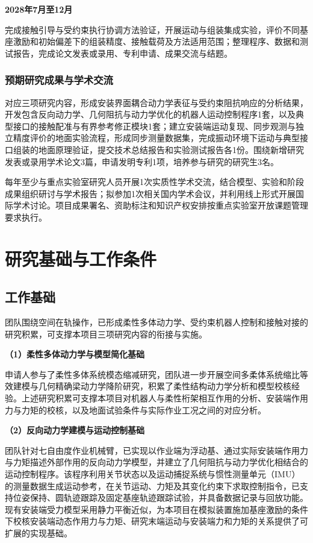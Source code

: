 \documentclass[UTF8,a4paper,zihao=-4,fontset=fandol]{ctexart}
\newcommand{\topic}[1]{\par\Needspace{4\baselineskip}\addvspace{0.5em}\noindent\textbf{#1}\par\nobreak}
\begin{document}
\topic{2028年7月至12月}
完成接触引导与受约束执行协调方法验证，开展运动与组装集成实验，评价不同基座激励和初始偏差下的组装精度、接触载荷及方法适用范围；整理程序、数据和测试报告，完成论文发表或录用、专利申请、成果交流与结题。

\subsubsection{预期研究成果与学术交流}

对应三项研究内容，形成安装界面耦合动力学表征与受约束阻抗响应的分析结果，开发包含反向动力学、几何阻抗与动力学优化的机器人运动控制程序1套，以及典型接口的接触配准与有界参考修正模块1套；建立安装端运动复现、同步观测与独立精度评价的地面实验流程，形成同步测量数据集，完成振动环境下运动与典型接口组装的地面原理验证，提交技术总结报告和实验测试报告各1份。围绕新增研究发表或录用学术论文3篇，申请发明专利1项，培养参与研究的研究生3名。

每年至少与重点实验室研究人员开展1次实质性学术交流，结合模型、实验和阶段成果组织研讨与学术报告；拟参加1次相关国内学术会议，并利用线上形式开展国际学术讨论。项目成果署名、资助标注和知识产权安排按重点实验室开放课题管理要求执行。

\section{研究基础与工作条件}

\subsection{工作基础}

团队围绕空间在轨操作，已形成柔性多体动力学、受约束机器人控制和接触对接的研究积累，可支撑本项目三项研究内容的衔接与实施。

\topic{（1）柔性多体动力学与模型简化基础}

申请人参与了柔性多体系统模态缩减研究\cite{sonneville2021}，团队进一步开展空间多柔体系统缩比等效建模\cite{qi2025}与几何精确梁动力学降阶研究，积累了柔性结构动力学分析和模型校核经验。上述研究积累可支撑本项目对机器人与柔性桁架相互作用的分析、安装端作用力与力矩的校核，以及地面试验条件与实际作业工况之间的对应分析。

\topic{（2）反向动力学建模与运动控制基础}

团队针对七自由度作业机械臂，已实现以作业端为浮动基、通过实际安装端作用力与力矩描述外部作用的反向动力学模型，并建立了几何阻抗与动力学优化相结合的运动控制程序。该程序利用关节状态以及运动捕捉系统与惯性测量单元（IMU）的测量数据生成运动参考，在关节运动、力矩及其变化约束下求取控制指令，已支持位姿保持、圆轨迹跟踪及固定基座轨迹跟踪试验，并具备数据记录与回放功能。现有安装端受力模型采用静力平衡近似，为本项目在模拟装置施加基座激励的条件下校核安装端动态作用力与力矩、研究末端运动与安装端力和力矩的关系提供了可扩展的实现基础。
\end{document}
